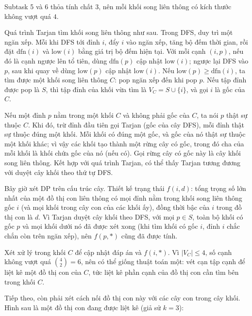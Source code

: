 \documentclass[11pt]{article}
\begin{document}
Subtask 5 và 6 thỏa tính chất 3, nên mỗi khối song liên thông có kích thước
không vượt quá \(4\).

Quá trình Tarjan tìm khối song liên thông như sau. Trong DFS, duy trì một
ngăn xếp. Mỗi khi DFS tới đỉnh \(i\), đẩy \(i\) vào ngăn xếp, tăng bộ đếm
thời gian, rồi đặt \(\mathrm{dfn}(i)\) và \(\mathrm{low}(i)\) bằng giá trị bộ
đếm hiện tại. Với mỗi cạnh \((i,p)\), nếu đó là cạnh ngược lên tổ tiên, dùng
\(\mathrm{dfn}(p)\) cập nhật \(\mathrm{low}(i)\); ngược lại DFS vào \(p\), sau
khi quay về dùng \(\mathrm{low}(p)\) cập nhật \(\mathrm{low}(i)\). Nếu
\(\mathrm{low}(p)\ge\mathrm{dfn}(i)\), ta tìm được một khối song liên thông
\(C\): pop ngăn xếp đến khi pop \(p\). Nếu tập đỉnh được pop là \(S\), thì tập
đỉnh của khối vừa tìm là \(V_C=S\cup\{i\}\), và gọi \(i\) là gốc của \(C\).

Nếu một đỉnh \(p\) nằm trong một khối \(C\) và không phải gốc của \(C\), ta nói
\(p\) thật sự thuộc \(C\). Khi đó, trừ đỉnh đầu tiên gọi Tarjan (gốc của cây
DFS), mỗi đỉnh thật sự thuộc đúng một khối. Mỗi khối có đúng một gốc, và gốc
của nó thật sự thuộc một khối khác; vì vậy các khối tạo thành một rừng cây có
gốc, trong đó cha của mỗi khối là khối chứa gốc của nó (nếu có). Gọi rừng cây
có gốc này là cây khối song liên thông. Kết hợp với quá trình Tarjan, có thể
thấy Tarjan tương đương với duyệt cây khối theo thứ tự DFS.

Bây giờ xét DP trên cấu trúc cây. Thiết kế trạng thái \(f(i,d)\): tổng trọng
số lớn nhất của một đồ thị con liên thông có mọi đỉnh nằm trong khối song liên
thông gốc \(i\) (và mọi khối trong cây con của các khối ấy), đồng thời bậc của
\(i\) trong đồ thị con là \(d\). Vì Tarjan duyệt cây khối theo DFS, với mọi
\(p\in S\), toàn bộ khối có gốc \(p\) và mọi khối dưới nó đã được xét xong
(khi tìm khối có gốc \(i\), đỉnh \(i\) chắc chắn còn trên ngăn xếp), nên
\(f(p,*)\) cũng đã được tính.

Xét xử lý trong khối \(C\) để cập nhật đáp án và \(f(i,*)\). Vì \(|V_C|\le 4\),
số cạnh không vượt quá \(\binom{4}{2}=6\), nên có thể giống thuật toán một:
vét cạn tập cạnh để liệt kê một đồ thị con của \(C\), tức liệt kê phần cạnh
của đồ thị con cần tìm bên trong khối \(C\).

Tiếp theo, còn phải xét cách nối đồ thị con này với các cây con trong cây
khối. Hình sau là một đồ thị con đang được liệt kê (giả sử \(k=3\)):

\begin{center}
\end{center}
\end{document}
